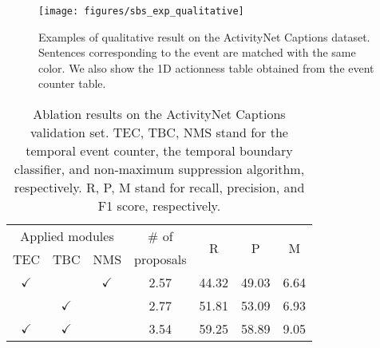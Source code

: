 \begin{figure}[t]
  \centering
  \texttt{[image: figures/sbs\_exp\_qualitative]}
  \caption{
    Examples of qualitative result on the ActivityNet Captions dataset.
    Sentences corresponding to the event are matched with the same color.
    We also show the 1D actionness table obtained from the event counter table.
  }
  \label{fig:experiment_qualitative}
\end{figure}


\begin{table}[t]
  \parbox{\linewidth}{
    \centering
    \caption{
      Ablation results on the ActivityNet Captions validation set.
      TEC, TBC, NMS stand for the temporal event counter, the temporal boundary classifier, and non-maximum suppression algorithm, respectively.
      R, P, M stand for recall, precision, and F1 score, respectively.
    }
    \begin{tabular}{ccc|c|c|c|c}
      \hline
      \multicolumn{3}{c|}{Applied modules} & \# of        & \multirow{2}{*}{R} & \multirow{2}{*}{P} & \multirow{2}{*}{M}                \\
      TEC                                  & TBC          & NMS                & proposals          &                    &              \\
      \hline
      $\checkmark$                         &              & $\checkmark$       & 2.57               & 44.32              & 49.03 & 6.64 \\
                                           & $\checkmark$ &                    & 2.77               & 51.81              & 53.09 & 6.93 \\
      $\checkmark$                         & $\checkmark$ &                    & 3.54               & 59.25              & 58.89 & 9.05 \\
      \hline
    \end{tabular}
    \label{tab:exp_ablation_module}
  }
\end{table}

